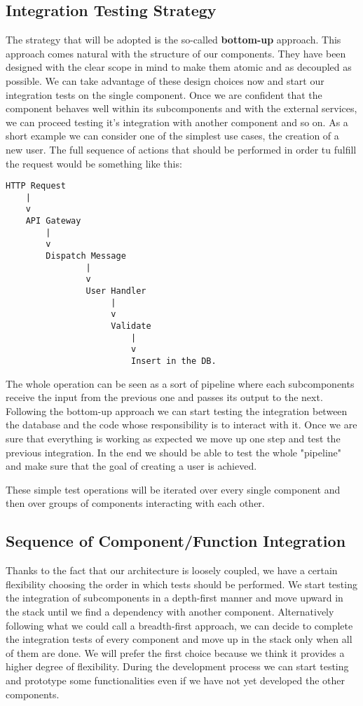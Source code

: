 \subsection{Integration Testing Strategy}
The strategy that will be adopted is the so-called \textbf{bottom-up} approach.
This approach comes natural with the structure of our components. They have been
designed with the clear scope in mind to make them atomic and as decoupled as possible.
We can take advantage of these design choices now and start our integration tests
on the single component. Once we are confident that the component behaves
well within its subcomponents and with the external services, we can proceed testing
it's integration with another component and so on.
As a short example we can consider one of the simplest use cases, the creation of a new user.
The full sequence of actions that should be performed in order tu fulfill the request
would be something like this:
\lstset{basicstyle=\ttfamily\footnotesize,breaklines=true}
\begin{lstlisting}
HTTP Request
    |
    v
    API Gateway
        |
        v
        Dispatch Message
                |
                v 
                User Handler
                     |
                     v
                     Validate
                         |
                         v
                         Insert in the DB.
\end{lstlisting}
The whole operation can be seen as a sort of pipeline where each subcomponents
receive the input from the previous one and passes its output to the next.
Following the bottom-up approach we can start testing the integration between the
database and the code whose responsibility is to interact with it. Once we are sure
that everything is working as expected we move up one step and test the previous integration.
In the end we should be able to test the whole "pipeline" and make sure that the
goal of creating a user is achieved.

These simple test operations will be iterated over every single component and then
over groups of components interacting with each other.

\subsection{Sequence of Component/Function Integration}
Thanks to the fact that our architecture is loosely coupled, we have a certain flexibility
choosing the order in which tests should be performed.
We start testing the integration of subcomponents in a depth-first manner and
move upward in the stack until we find a dependency with another component.
Alternatively following what we could call a breadth-first approach,
we can decide to complete the integration tests of every component and
move up in the stack only when all of them are done.
We will prefer the first choice because we think it provides a higher degree of
flexibility. During the development process we can start testing and prototype
some functionalities even if we have not yet developed the other components.

